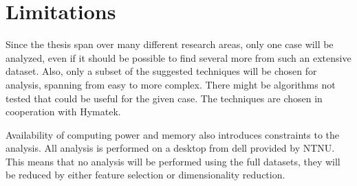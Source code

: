     

    
    
    

\section{Limitations}\label{sec:assumptions}
    Since the thesis span over many different research areas, only one case will be analyzed, even if it should be possible to find several more from such an extensive dataset. Also, only a subset of the suggested techniques will be chosen for analysis, spanning from easy to more complex. There might be algorithms not tested that could be useful for the given case. The techniques are chosen in cooperation with Hymatek. 
    
    Availability of computing power and memory also introduces constraints to the analysis. All analysis is performed on a desktop from dell provided by NTNU. This means that no analysis will be performed using the full datasets, they will be reduced by either feature selection or dimensionality reduction. 
    
